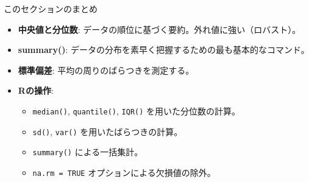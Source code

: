 \documentclass[
  ignorenonframetext,
]{beamer}
\providecommand{\tightlist}{%
  \setlength{\itemsep}{0pt}\setlength{\parskip}{0pt}}
\begin{document}
\begin{frame}[fragile]{このセクションのまとめ}
\protect\hypertarget{ux3053ux306eux30bbux30afux30b7ux30e7ux30f3ux306eux307eux3068ux3081}{}
\begin{itemize}
\tightlist
\item
  \textbf{中央値と分位数}:
  データの順位に基づく要約。外れ値に強い（ロバスト）。
\item
  \textbf{summary()}:
  データの分布を素早く把握するための最も基本的なコマンド。
\item
  \textbf{標準偏差}: 平均の周りのばらつきを測定する。
\item
  \textbf{Rの操作}:

  \begin{itemize}
  \tightlist
  \item
    \texttt{median()}, \texttt{quantile()}, \texttt{IQR()}
    を用いた分位数の計算。
  \item
    \texttt{sd()}, \texttt{var()} を用いたばらつきの計算。
  \item
    \texttt{summary()} による一括集計。
  \item
    \texttt{na.rm\ =\ TRUE} オプションによる欠損値の除外。
  \end{itemize}
\end{itemize}
\end{frame}
\end{document}
